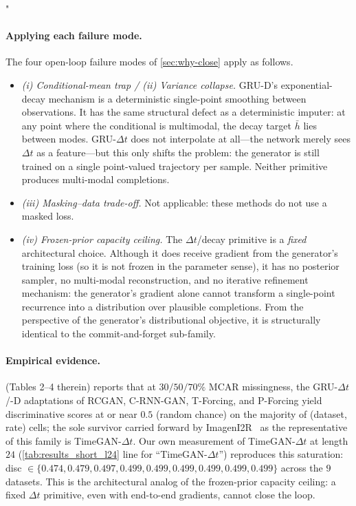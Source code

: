 "\documentclass{article}
\theoremstyle{plain}
\theoremstyle{definition}
\theoremstyle{remark}
\begin{document}
\paragraph{Applying each failure mode.}
The four open-loop failure modes of \cref{sec:why-close} apply as follows.
\begin{itemize}
\setlength{\itemsep}{0pt}
\item \emph{(i) Conditional-mean trap / (ii) Variance collapse.} GRU-D's exponential-decay mechanism is a deterministic single-point smoothing between observations. It has the same structural defect as a deterministic imputer: at any point where the conditional is multimodal, the decay target $\bar{h}$ lies between modes. GRU-$\Delta t$ does not interpolate at all---the network merely sees $\Delta t$ as a feature---but this only shifts the problem: the generator is still trained on a single point-valued trajectory per sample. Neither primitive produces multi-modal completions.
\item \emph{(iii) Masking--data trade-off.} Not applicable: these methods do not use a masked loss.
\item \emph{(iv) Frozen-prior capacity ceiling.} The $\Delta t$/decay primitive is a \emph{fixed} architectural choice. Although it does receive gradient from the generator's training loss (so it is not frozen in the parameter sense), it has no posterior sampler, no multi-modal reconstruction, and no iterative refinement mechanism: the generator's gradient alone cannot transform a single-point recurrence into a distribution over plausible completions. From the perspective of the generator's distributional objective, it is structurally identical to the commit-and-forget sub-family.
\end{itemize}

\paragraph{Empirical evidence.}
\citet{jeon2022gtgan} (Tables 2--4 therein) reports that at $30/50/70\%$ MCAR missingness, the GRU-$\Delta t$/-D adaptations of RCGAN, C-RNN-GAN, T-Forcing, and P-Forcing yield discriminative scores at or near $0.5$ (random chance) on the majority of (dataset, rate) cells; the sole survivor carried forward by ImagenI2R~\citep{fadlon2025imageni2r} as the representative of this family is TimeGAN-$\Delta t$. Our own measurement of TimeGAN-$\Delta t$ at length $24$ (\cref{tab:results_short_l24} line for ``TimeGAN-$\Delta t$'') reproduces this saturation: disc $\in \{0.474, 0.479, 0.497, 0.499, 0.499, 0.499, 0.499, 0.499, 0.499\}$ across the $9$ datasets. This is the architectural analog of the frozen-prior capacity ceiling: a fixed $\Delta t$ primitive, even with end-to-end gradients, cannot close the loop.
\end{document}

